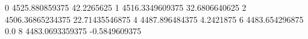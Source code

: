 0 4525.880859375 42.2265625
1 4516.3349609375 32.6806640625
2 4506.36865234375 22.71435546875
4 4487.896484375 4.2421875
6 4483.654296875 0.0
8 4483.0693359375 -0.5849609375
